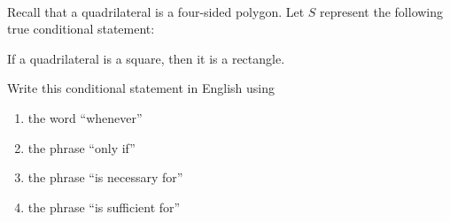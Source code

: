 \begin{prog}\label{pr:onlyif} \hfill \\
Recall that a quadrilateral is a four-sided polygon.  Let  $S$  represent the following true conditional statement:
\begin{center}
If a quadrilateral is a square, then it is a rectangle.
\end{center}

\noindent
Write this conditional statement in English using

\begin{multicols}{2}
\begin{enumerate}
\item the word ``whenever''

\item the phrase ``only if''

\item the phrase ``is necessary for''

\item the phrase ``is sufficient for''
\end{enumerate}
\end{multicols}

\end{prog}
\hbreak


\endinput
